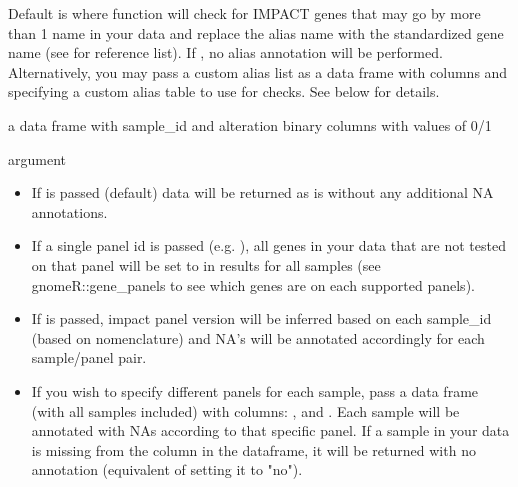 \documentclass[a4paper]{book}
\begin{document}
\begin{Arguments}
\begin{ldescription}
\item[\code{recode\_aliases}] Default is  where function will check for IMPACT genes that may go by more than 1 name in your data and replace the alias name with the standardized gene name (see  for reference list).
If , no alias annotation will be performed.
Alternatively, you may pass a custom alias list as a data frame with columns  and  specifying a custom alias table to use for checks. See below for details.
\end{ldescription}
\end{Arguments}
%
\begin{Value}
a data frame with sample\_id and alteration binary columns with values of 0/1
\end{Value}
%
\begin{Section}{ argument}

\begin{itemize}

\item{} If  is passed (default) data will be returned as is without any additional NA annotations.
\item{} If a single panel id is passed (e.g. ), all genes in your data that are not tested on that panel will be set to
 in results for all samples (see gnomeR::gene\_panels to see which genes are on each supported panels).
\item{} If  is passed, impact panel version will be inferred based on each sample\_id (based on  nomenclature) and NA's will be
annotated accordingly for each sample/panel pair.
\item{} If you wish to specify different panels for each sample, pass a data frame (with all samples included) with columns: , and . Each sample will be
annotated with NAs according to that specific panel. If a sample in your data is missing from the  column in the
 dataframe, it will be returned with no annotation (equivalent of setting it to "no").

\end{itemize}

\end{Section}
%
\end{document}
